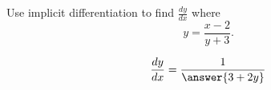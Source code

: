 \documentclass{ximera}
\author{Steven Gubkin\and Nela Lakos}
\begin{document}
\begin{exercise}

Use implicit differentiation to find $\frac{dy}{dx}$ where
\[
y = \frac{x-2}{y+3}.
\]
\begin{prompt}
\[
\frac{dy}{dx} =\frac{1}{ \answer{3+2y}}
\]
\end{prompt}
\end{exercise}
\end{document}
